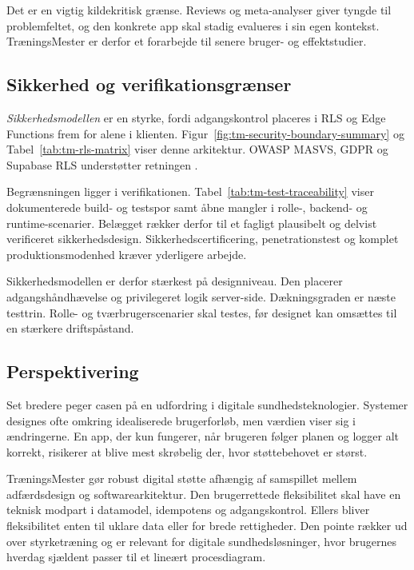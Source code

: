 Det er en vigtig kildekritisk grænse. Reviews og meta-analyser giver tyngde til problemfeltet, og den konkrete app skal stadig evalueres i sin egen kontekst. TræningsMester er derfor et forarbejde til senere bruger- og effektstudier.

\subsection{Sikkerhed og verifikationsgrænser}

\emph{Sikkerhedsmodellen} er en styrke, fordi adgangskontrol placeres i RLS og Edge Functions frem for alene i klienten. Figur~\ref{fig:tm-security-boundary-summary} og Tabel~\ref{tab:tm-rls-matrix} viser denne arkitektur. OWASP MASVS, GDPR og Supabase RLS understøtter retningen \cite{owasp2024_masvs,europeanparliament2016_gdpr,supabase_rls_docs}.

Begrænsningen ligger i verifikationen. Tabel~\ref{tab:tm-test-traceability} viser dokumenterede build- og testspor samt åbne mangler i rolle-, backend- og runtime-scenarier. Belægget rækker derfor til et fagligt plausibelt og delvist verificeret sikkerhedsdesign. Sikkerhedscertificering, penetrationstest og komplet produktionsmodenhed kræver yderligere arbejde.

Sikkerhedsmodellen er derfor stærkest på designniveau. Den placerer adgangshåndhævelse og privilegeret logik server-side. Dækningsgraden er næste testtrin. Rolle- og tværbrugerscenarier skal testes, før designet kan omsættes til en stærkere driftspåstand.

\subsection{Perspektivering}

Set bredere peger casen på en udfordring i digitale sundhedsteknologier. Systemer designes ofte omkring idealiserede brugerforløb, men værdien viser sig i ændringerne. En app, der kun fungerer, når brugeren følger planen og logger alt korrekt, risikerer at blive mest skrøbelig der, hvor støttebehovet er størst.

TræningsMester gør robust digital støtte afhængig af samspillet mellem adfærdsdesign og softwarearkitektur. Den brugerrettede fleksibilitet skal have en teknisk modpart i datamodel, idempotens og adgangskontrol. Ellers bliver fleksibilitet enten til uklare data eller for brede rettigheder. Den pointe rækker ud over styrketræning og er relevant for digitale sundhedsløsninger, hvor brugernes hverdag sjældent passer til et lineært procesdiagram.

